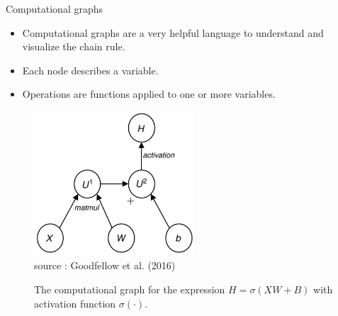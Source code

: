 \begin{vbframe}{Computational graphs}
  \begin{minipage}{0.45\textwidth}
    \begin{itemize}
      \item Computational graphs are a very helpful language to understand and visualize the chain rule.
      \item Each node describes a variable.
      \item Operations are functions applied to one or more variables.
    \end{itemize}
  \end{minipage}\hfill
  \begin{minipage}{0.5\textwidth}
    \begin{figure}
      \centering
        \includegraphics[width=6cm]{plots/compgraph1.png}
        \tiny{\\source : Goodfellow et al. (2016)}
        \caption{The computational graph for the expression $H = \sigma(XW + B)$ with activation function $\sigma(\cdot)$.}
    \end{figure}
  \end{minipage}  
\end{vbframe}

